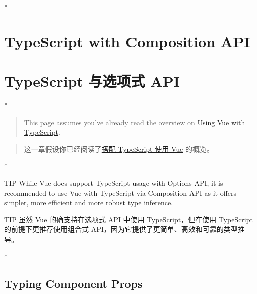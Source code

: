 \begin{paracol}{2} 
 
\switchcolumn[0]*%
\section{TypeScript with Composition API}
\switchcolumn
\section{TypeScript 与选项式 API}
\switchcolumn[0]*%
\begin{quote}
This page assumes you've already read the overview on
\href{https://vuejs.org/guide/typescript/overview.html}{Using Vue with
TypeScript}.
\end{quote}
\switchcolumn
\begin{quote}
这一章假设你已经阅读了\href{https://cn.vuejs.org/guide/typescript/overview.html}{搭配
TypeScript 使用 Vue} 的概览。
\end{quote}
\switchcolumn[0]*%
\begin{vueQuote}{TIP}
While Vue does support TypeScript usage with Options API, it is recommended to use Vue with TypeScript via Composition API as it offers simpler, more efficient and more robust type inference.
\end{vueQuote} 
\switchcolumn
\begin{vueQuote}{TIP}
虽然 Vue 的确支持在选项式 API 中使用 TypeScript，但在使用 TypeScript
的前提下更推荐使用组合式 API，因为它提供了更简单、高效和可靠的类型推导。
\end{vueQuote} 
\switchcolumn[0]*%
\subsection{Typing Component Props}
\switchcolumn

\end{paracol}
